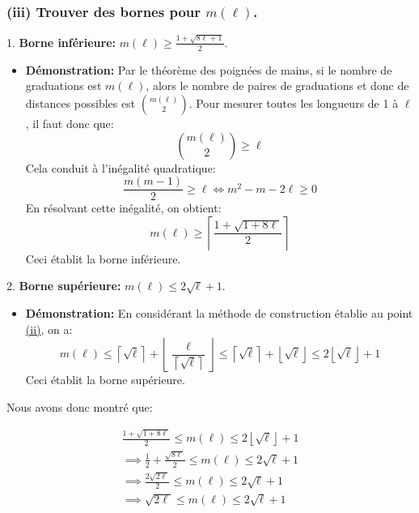 \subsubsection*{(iii) Trouver des bornes pour $m(\ell)$.}

1. \textbf{Borne inférieure:} $m(\ell) \geq \frac{1+\sqrt{8\ell+1}}{2}$.

\begin{itemize}[leftmargin=2cm]
	\item \textbf{Démonstration:} Par le théorème des poignées de mains, si le nombre de graduations est $m(\ell)$, alors le nombre de paires de graduations et donc de distances possibles est $\binom{m(\ell)}{2}$. Pour mesurer toutes les longueurs de 1 à $\ell$, il faut donc que:
	\[
		\binom{m(\ell)}{2} \geq \ell
	\]
	Cela conduit à l'inégalité quadratique:
	\[
		\frac{m(m-1)}{2} \geq \ell \iff m^2 - m - 2\ell \geq 0
	\]
	En résolvant cette inégalité, on obtient:
	\[
		m(\ell) \geq \left\lceil \frac{1 + \sqrt{1 + 8\ell}}{2} \right\rceil
	\]
	Ceci établit la borne inférieure.

\end{itemize}




\vspace{1\baselineskip}


2. \textbf{Borne supérieure:} $m(\ell) \leq 2\sqrt{\ell} + 1$.

\begin{itemize}[leftmargin=2cm]
	\item \textbf{Démonstration:} En considérant la méthode de construction établie au point \hyperref[sec:ii]{(ii)}, on a:
		\[
			m(\ell) \leq  \left\lceil \sqrt{\ell} \right\rceil + \left\lfloor \frac{\ell}{\left\lceil \sqrt{\ell} \right\rceil} \right\rfloor \leq \left\lceil \sqrt{\ell} \right\rceil + \left\lfloor \sqrt{\ell} \right\rfloor \leq 2 \left\lfloor \sqrt{\ell} \right\rfloor + 1
		\]
		Ceci établit la borne supérieure.
\end{itemize}



\vspace{2\baselineskip}

Nous avons donc montré que:

\begin{align*}
	\frac{1 + \sqrt{1 + 8\ell}}{2} \leq m(\ell) \leq 2 \left\lfloor \sqrt{\ell} \right\rfloor + 1 \\
	\implies \frac{1}{2} + \frac{\sqrt{8\ell}}{2} \leq m(\ell) \leq 2 \sqrt{\ell} + 1 \\
	\implies \frac{2\sqrt{2\ell}}{2} \leq m(\ell) \leq 2 \sqrt{\ell} + 1 \\
	\implies \sqrt{2\ell} \leq m(\ell) \leq 2\sqrt{\ell} + 1
\end{align*}